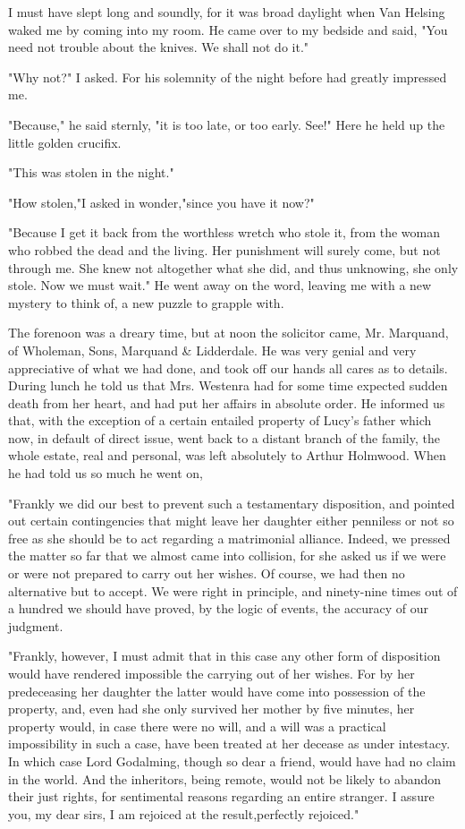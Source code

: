 I must have slept long and soundly, for it was broad daylight when Van Helsing waked me by coming into my room. He came over to my bedside and said, "You need not trouble about the knives. We shall not do it." 

"Why not?" I asked. For his solemnity of the night before had greatly impressed me. 

"Because," he said sternly, "it is too late, or too early. See!" Here he held up the little golden crucifix. 

"This was stolen in the night." 

"How stolen,"I asked in wonder,"since you have it now?" 

"Because I get it back from the worthless wretch who stole it, from the woman who robbed the dead and the living. Her punishment will surely come, but not through me. She knew not altogether what she did, and thus unknowing, she only stole. Now we must wait." He went away on the word, leaving me with a new mystery to think of, a new puzzle to grapple with. 

The forenoon was a dreary time, but at noon the solicitor came, Mr. Marquand, of Wholeman, Sons, Marquand \& Lidderdale. He was very genial and very appreciative of what we had done, and took off our hands all cares as to details. During lunch he told us that Mrs. Westenra had for some time expected sudden death from her heart, and had put her affairs in absolute order. He informed us that, with the exception of a certain entailed property of Lucy's father which now, in default of direct issue, went back to a distant branch of the family, the whole estate, real and personal, was left absolutely to Arthur Holmwood. When he had told us so much he went on, 

"Frankly we did our best to prevent such a testamentary disposition, and pointed out certain contingencies that might leave her daughter either penniless or not so free as she should be to act regarding a matrimonial alliance. Indeed, we pressed the matter so far that we almost came into collision, for she asked us if we were or were not prepared to carry out her wishes. Of course, we had then no alternative but to accept. We were right in principle, and ninety-nine times out of a hundred we should have proved, by the logic of events, the accuracy of our judgment. 

"Frankly, however, I must admit that in this case any other form of disposition would have rendered impossible the carrying out of her wishes. For by her predeceasing her daughter the latter would have come into possession of the property, and, even had she only survived her mother by five minutes, her property would, in case there were no will, and a will was a practical impossibility in such a case, have been treated at her decease as under intestacy. In which case Lord Godalming, though so dear a friend, would have had no claim in the world. And the inheritors, being remote, would not be likely to abandon their just rights, for sentimental reasons regarding an entire stranger. I assure you, my dear sirs, I am rejoiced at the result,perfectly rejoiced." 

